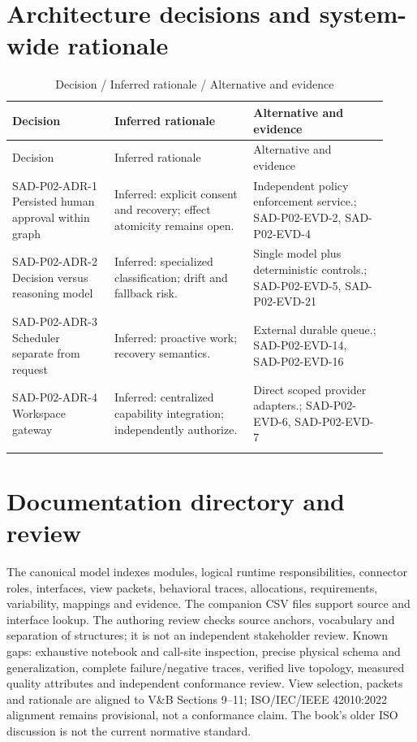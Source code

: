 \documentclass[10pt,letterpaper]{article}
\begin{document}
\section{Architecture decisions and system-wide rationale}
\begin{longtable}{@{}>{\raggedright\arraybackslash}p{0.25\linewidth}>{\raggedright\arraybackslash}p{0.34\linewidth}>{\raggedright\arraybackslash}p{0.33\linewidth}@{}}
\caption{Decision / Inferred rationale / Alternative and evidence}\\
\toprule Decision & Inferred rationale & Alternative and evidence\\\midrule\endfirsthead
\toprule Decision & Inferred rationale & Alternative and evidence\\\midrule\endhead
SAD-P02-ADR-1 Persisted human approval within graph & Inferred: explicit consent and recovery; effect atomicity remains open. & Independent policy enforcement service.; SAD-P02-EVD-2, SAD-P02-EVD-4\\\addlinespace
SAD-P02-ADR-2 Decision versus reasoning model & Inferred: specialized classification; drift and fallback risk. & Single model plus deterministic controls.; SAD-P02-EVD-5, SAD-P02-EVD-21\\\addlinespace
SAD-P02-ADR-3 Scheduler separate from request & Inferred: proactive work; recovery semantics. & External durable queue.; SAD-P02-EVD-14, SAD-P02-EVD-16\\\addlinespace
SAD-P02-ADR-4 Workspace gateway & Inferred: centralized capability integration; independently authorize. & Direct scoped provider adapters.; SAD-P02-EVD-6, SAD-P02-EVD-7\\\addlinespace
\bottomrule\end{longtable}

\section{Documentation directory and review}
The canonical model indexes modules, logical runtime responsibilities, connector roles, interfaces, view packets, behavioral traces, allocations, requirements, variability, mappings and evidence. The companion CSV files support source and interface lookup. The authoring review checks source anchors, vocabulary and separation of structures; it is not an independent stakeholder review. Known gaps: exhaustive notebook and call-site inspection, precise physical schema and generalization, complete failure/negative traces, verified live topology, measured quality attributes and independent conformance review. View selection, packets and rationale are aligned to V\&B Sections 9--11; ISO/IEC/IEEE 42010:2022 alignment remains provisional, not a conformance claim. The book's older ISO discussion is not the current normative standard.
\appendix
\end{document}
